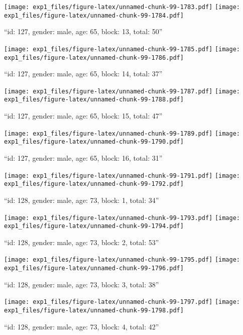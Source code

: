 \documentclass[,]{article}
\begin{document}
\texttt{[image: exp1\_files/figure-latex/unnamed-chunk-99-1783.pdf]}
\texttt{[image: exp1\_files/figure-latex/unnamed-chunk-99-1784.pdf]}

\newpage
[1] 

``id: 127, gender: male, age: 65, block: 13, total: 50''

\texttt{[image: exp1\_files/figure-latex/unnamed-chunk-99-1785.pdf]}
\texttt{[image: exp1\_files/figure-latex/unnamed-chunk-99-1786.pdf]}

\newpage
[1] 

``id: 127, gender: male, age: 65, block: 14, total: 37''

\texttt{[image: exp1\_files/figure-latex/unnamed-chunk-99-1787.pdf]}
\texttt{[image: exp1\_files/figure-latex/unnamed-chunk-99-1788.pdf]}

\newpage
[1] 

``id: 127, gender: male, age: 65, block: 15, total: 47''

\texttt{[image: exp1\_files/figure-latex/unnamed-chunk-99-1789.pdf]}
\texttt{[image: exp1\_files/figure-latex/unnamed-chunk-99-1790.pdf]}

\newpage
[1] 

``id: 127, gender: male, age: 65, block: 16, total: 31''

\texttt{[image: exp1\_files/figure-latex/unnamed-chunk-99-1791.pdf]}
\texttt{[image: exp1\_files/figure-latex/unnamed-chunk-99-1792.pdf]}

\newpage
[1] 

``id: 128, gender: male, age: 73, block: 1, total: 34''

\texttt{[image: exp1\_files/figure-latex/unnamed-chunk-99-1793.pdf]}
\texttt{[image: exp1\_files/figure-latex/unnamed-chunk-99-1794.pdf]}

\newpage
[1] 

``id: 128, gender: male, age: 73, block: 2, total: 53''

\texttt{[image: exp1\_files/figure-latex/unnamed-chunk-99-1795.pdf]}
\texttt{[image: exp1\_files/figure-latex/unnamed-chunk-99-1796.pdf]}

\newpage
[1] 

``id: 128, gender: male, age: 73, block: 3, total: 38''

\texttt{[image: exp1\_files/figure-latex/unnamed-chunk-99-1797.pdf]}
\texttt{[image: exp1\_files/figure-latex/unnamed-chunk-99-1798.pdf]}

\newpage
[1] 

``id: 128, gender: male, age: 73, block: 4, total: 42''
\end{document}
